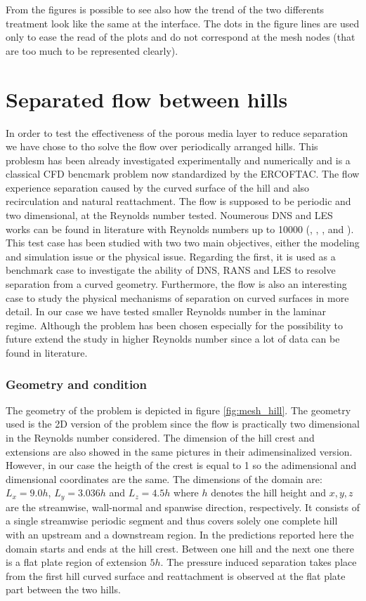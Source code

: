 From the figures is possible to see also how the trend of the two differents treatment look like the same at the interface.
The dots in the figure lines are used only to ease the read of the plots and do not correspond at the mesh nodes (that are too much to be represented clearly).

\section{Separated flow between hills}
In order to test the effectiveness of the porous media layer to reduce separation we have chose to tho solve the flow over periodically arranged hills. This problesm  has been already investigated experimentally and numerically and is a classical CFD bencmark problem now standardized by the ERCOFTAC. 
The flow experience separation caused by the curved surface of the hill and also recirculation and natural reattachment. The flow is supposed to be periodic and two dimensional, at the Reynolds number tested. Noumerous DNS and LES works can be found in literature with Reynolds numbers up to 10000 (\citet{chang2014simulations}, \citet{breuer2005issues}, \citet{breuer2009flow}, \cite{almeida1993wake} and \cite{temmerman2001large}).
This test case has been studied with two two main objectives, either the modeling and simulation issue or the physical issue. Regarding the first, it is used as a benchmark case to investigate the ability of DNS, RANS and LES to resolve separation from a curved geometry. Furthermore, the flow is also an interesting case to study the physical mechanisms of separation on curved surfaces in more detail.
In our case we have tested smaller Reynolds number in the laminar regime. Although the problem has been chosen especially for the possibility to future extend the study in higher Reynolds number since a lot of data can be found in literature.

\subsubsection{Geometry and condition}
The geometry of the problem is depicted in figure \ref{fig:mesh_hill}. The geometry used is the 2D version of the problem since the flow is practically two dimensional in the Reynolds number considered. The dimension of the hill crest and extensions are also showed in the same pictures in their adimensinalized version. However, in our case the heigth of the crest is equal to 1 so the adimensional and dimensional coordinates are the same. The dimensions of the domain are: $L_x = 9.0 h$, $L_y = 3.036 h$ and $L_z = 4.5 h$ where $h$ denotes the hill height and $x,y,z$ are the streamwise, wall-normal and spanwise direction, respectively. It consists of a single streamwise periodic segment and thus covers solely one complete hill with an upstream and a downstream region. In the predictions reported here the domain starts and ends at the hill crest. 
Between one hill and the next one there is a flat plate region of extension $5h$. The pressure induced separation takes place from the first hill curved surface and reattachment is observed at the flat plate part between the two hills.


